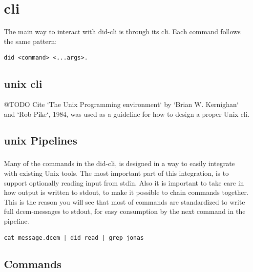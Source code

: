 \chapter{\acrfull{cli}}

The main way to interact with \acrshort{did-cli} is through its \acrfull{cli}. Each command follows the same pattern:


\begin{lstlisting}
did <command> <...args>.
\end{lstlisting}


\section{\gls{unix} \acrshort{cli}}

@TODO Cite `The Unix Programming environment` by `Brian W. Kernighan` and `Rob Pike`, 1984, was used as a guideline for how to design a proper Unix \acrshort{cli}.



\section{\gls{unix} Pipelines}

\paragraph{}
Many of the commands in the \acrshort{did-cli}, is designed in a way to easily integrate with existing Unix tools. The most important part of this integration, is to support optionally reading input from \acrfull{stdin}. Also it is important to take care in how output is written to \acrfull{stdout}, to make it possible to chain commands together. This is the reason you will see that most of commands are standardized to write full \acrshort{dcem}-messages to \acrshort{stdout}, for easy consumption by the next command in the pipeline.


\begin{lstlisting}
cat message.dcem | did read | grep jonas 
\end{lstlisting}

\newpage

\section{Commands}



